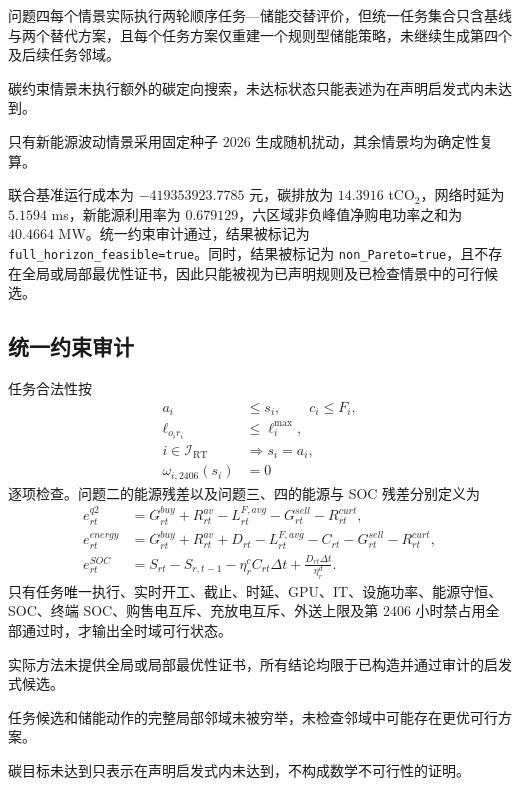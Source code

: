 问题四每个情景实际执行两轮顺序任务—储能交替评价，但统一任务集合只含基线与两个替代方案，且每个任务方案仅重建一个规则型储能策略，未继续生成第四个及后续任务邻域。

碳约束情景未执行额外的碳定向搜索，未达标状态只能表述为在声明启发式内未达到。

只有新能源波动情景采用固定种子 $2026$ 生成随机扰动，其余情景均为确定性复算。

联合基准运行成本为 $-419353923.7785$ 元，碳排放为 $14.3916$ tCO$_2$，网络时延为 $5.1594$ ms，新能源利用率为 $0.679129$，六区域非负峰值净购电功率之和为 $40.4664$ MW。统一约束审计通过，结果被标记为 \texttt{full\_horizon\_feasible=true}。同时，结果被标记为 \texttt{non\_Pareto=true}，且不存在全局或局部最优性证书，因此只能被视为已声明规则及已检查情景中的可行候选。

\subsection{统一约束审计}

任务合法性按
\begin{align}
a_i&\le s_i,\qquad c_i\le F_i,\\
\ell_{o_ir_i}&\le\ell_i^{\max},\\
i\in\mathcal I_{\mathrm{RT}}&\Rightarrow s_i=a_i,\\
\omega_{i,2406}(s_i)&=0
\end{align}
逐项检查。问题二的能源残差以及问题三、四的能源与 SOC 残差分别定义为
\begin{align}
e_{rt}^{q2}
&=G_{rt}^{buy}+R_{rt}^{av}
-L_{rt}^{F,avg}-G_{rt}^{sell}-R_{rt}^{curt},\\
e_{rt}^{energy}
&=G_{rt}^{buy}+R_{rt}^{av}+D_{rt}
-L_{rt}^{F,avg}-C_{rt}-G_{rt}^{sell}-R_{rt}^{curt},\\
e_{rt}^{SOC}
&=S_{rt}-S_{r,t-1}-\eta_r^cC_{rt}\Delta t
+\frac{D_{rt}\Delta t}{\eta_r^d}.
\end{align}
只有任务唯一执行、实时开工、截止、时延、GPU、IT、设施功率、能源守恒、SOC、终端 SOC、购售电互斥、充放电互斥、外送上限及第 $2406$ 小时禁占用全部通过时，才输出全时域可行状态。

实际方法未提供全局或局部最优性证书，所有结论均限于已构造并通过审计的启发式候选。

任务候选和储能动作的完整局部邻域未被穷举，未检查邻域中可能存在更优可行方案。

碳目标未达到只表示在声明启发式内未达到，不构成数学不可行性的证明。

